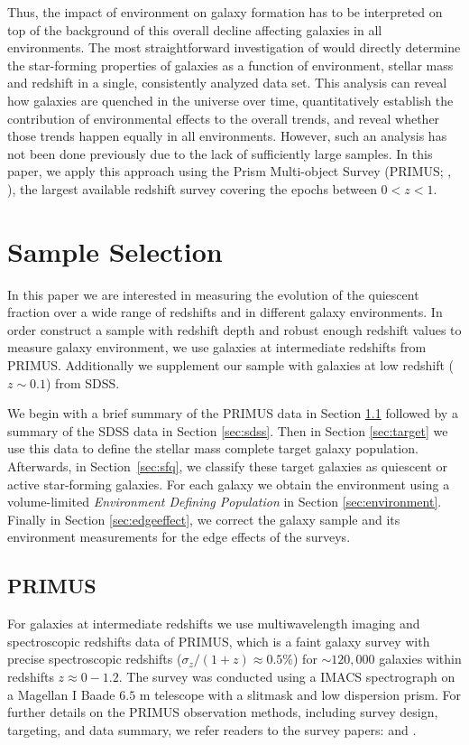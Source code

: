 \documentclass{emulateapj}
\begin{document}
Thus, the impact of environment on galaxy formation has to be
interpreted on top of the background of this overall decline affecting
galaxies in all environments.  The most straightforward investigation
of would directly determine the star-forming properties of galaxies as
a function of environment, stellar mass and redshift in a single,
consistently analyzed data set. This analysis can reveal how galaxies
are quenched in the universe over time, quantitatively establish the
contribution of environmental effects to the overall trends, and
reveal whether those trends happen equally in all environments.
However, such an analysis has not been done previously due to the lack
of sufficiently large samples. In this paper, we apply this approach
using the Prism Multi-object Survey (PRIMUS; \cite{Coil:2011aa}, 
\cite{Cool:2013aa}), the largest available redshift survey covering the epochs
between $0<z<1$.

\section{Sample Selection}
In this paper we are interested in measuring the evolution of the quiescent 
fraction over a wide range of redshifts and in different galaxy environments. 
In order construct a sample with redshift depth and robust enough redshift values 
to measure galaxy environment, we use galaxies at intermediate redshifts from PRIMUS. 
Additionally we supplement our sample with galaxies at low redshift ($z \sim 0.1$) from SDSS.

We begin with a brief summary of the PRIMUS data in Section \ref{sec:primus} followed by a summary of the SDSS data in Section \ref{sec:sdss}.
Then in Section \ref{sec:target} we use this data to define the stellar mass complete target galaxy population.
Afterwards, in Section~\ref{sec:sfq}, we classify these target galaxies as quiescent or active star-forming galaxies. 
For each galaxy we obtain the environment using a volume-limited {\em Environment Defining Population} in Section \ref{sec:environment}. 
Finally in Section \ref{sec:edgeeffect}, we correct the galaxy sample and its environment measurements for the edge effects of the surveys. 

\subsection{PRIMUS} \label{sec:primus}
For galaxies at intermediate redshifts we use multiwavelength imaging and spectroscopic redshifts data of PRIMUS, which is a faint galaxy survey with precise spectroscopic redshifts ($\sigma_z/(1+z) \approx 0.5 \%$) for $\sim 120,000$ galaxies within redshifts $z \approx 0-1.2$.
The survey was conducted using a IMACS spectrograph on a Magellan I Baade $6.5$ m telescope with a slitmask and low dispersion prism.
For further details on the PRIMUS observation methods, including survey design, targeting, and data summary, we refer readers to the survey papers: \cite{Coil:2011aa} and \cite{Cool:2013aa}.
\end{document}
